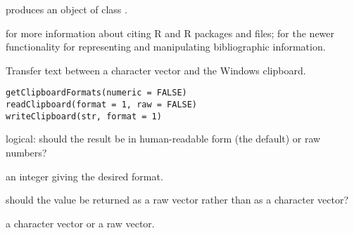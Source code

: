 %
\begin{Value}
 produces an object of class .
\end{Value}
%
\begin{SeeAlso}\relax
{} for more information about citing R and R
packages and  files;
 for the newer functionality for representing
and manipulating bibliographic information.
\end{SeeAlso}
%
\begin{Description}\relax
Transfer text between a character vector and the Windows clipboard.
\end{Description}
%
\begin{Usage}
\begin{verbatim}
getClipboardFormats(numeric = FALSE)
readClipboard(format = 1, raw = FALSE)
writeClipboard(str, format = 1)
\end{verbatim}
\end{Usage}
%
\begin{Arguments}
\begin{ldescription}
\item[\code{numeric}] logical: should the result be in human-readable form
(the default) or raw numbers?
\item[\code{format}] an integer giving the desired format.
\item[\code{raw}] should the value be returned as a raw vector rather than
as a character vector?
\item[\code{str}] a character vector or a raw vector.
\end{ldescription}
\end{Arguments}
%
